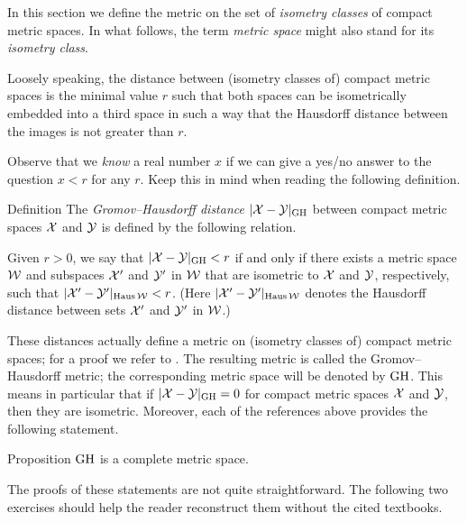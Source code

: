 In this section we define the metric on the set of \textit{isometry classes} of compact metric spaces.
In what follows, the term \textit{metric space} might also stand for its \textit{isometry class}.

Loosely speaking, the distance between (isometry classes of) compact metric spaces is the minimal value $r$ such that  both spaces can be isometrically embedded into a third space in such a way that the Hausdorff distance between the images is not greater than $r$.

Observe that we \textit{know} a real number $x$ if we can give a yes/no answer to the question $x<r$ for any $r$.
Keep this in mind when reading the following definition.

\begin{thm}{Definition}\label{def:GH}
The \emph{Gromov--Hausdorff distance} $|\mathcal{X}-\mathcal{Y}|_{\operatorname{\rm GH}\nolimits}$ between compact metric spaces $\mathcal{X}$ and $\mathcal{Y}$
is defined by the following
relation.

Given $r > 0$, we say that $|\mathcal{X}-\mathcal{Y}|_{\operatorname{\rm GH}\nolimits} < r$ if and only if there exists a metric
space $\mathcal{W}$ and subspaces $\mathcal{X}'$ and $\mathcal{Y}'$ in $\mathcal{W}$ that are isometric to $\mathcal{X}$ and $\mathcal{Y}$,
respectively, such that $|\mathcal{X}'-\mathcal{Y}'|_{\operatorname{\rm Haus}\nolimits\mathcal{W}} < r$.
(Here $|\spc{X}'\z-\spc{Y}'|_{\Haus\spc{W}}$ denotes the Hausdorff distance between sets $\mathcal{X}'$ and $\mathcal{Y}'$ in $\mathcal{W}$.)
\end{thm}

These distances actually define a metric on (isometry classes of) compact metric spaces; for a proof we refer to \cite{burago-burago-ivanov,petrunin2023pure}.
The resulting metric is called the Gromov--Hausdorff metric;
the corresponding metric space will be denoted by $\operatorname{\rm GH}\nolimits$.
This means in particular that if $|\spc{X}-\spc{Y}|_{\GH}\z=0$ for compact metric spaces $\mathcal{X}$ and $\mathcal{Y}$, then they are isometric.
Moreover, each of the references above provides the following statement.

\begin{thm}{Proposition}\label{prop:complete}
$\operatorname{\rm GH}\nolimits$ is a complete metric space.
\end{thm}

The proofs of these statements are not quite straightforward.
The following two exercises should help the reader reconstruct them
without the cited textbooks.



